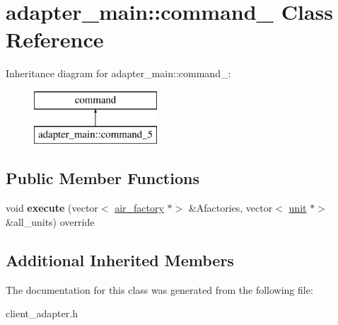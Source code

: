\hypertarget{classadapter__main_1_1command__5}{}\section{adapter\+\_\+main\+:\+:command\+\_ Class Reference}
\label{classadapter__main_1_1command__5}
Inheritance diagram for adapter\+\_\+main\+:\+:command\+\_\+:\begin{figure}[H]
\begin{center}
\leavevmode
\includegraphics[height=2.000000cm]{classadapter__main_1_1command__5}
\end{center}
\end{figure}
\subsection*{Public Member Functions}
\begin{DoxyCompactItemize}
\item 
\mbox{\label{classadapter__main_1_1command__5_a6ec76ad103fdb25233b613bb009c0b46}} 
void {\bfseries execute} (vector$<$ \mbox{\hyperlink{classair__factory}{air\+\_\+factory}} $\ast$$>$ \&Afactories, vector$<$ \mbox{\hyperlink{classunit}{unit}} $\ast$$>$ \&all\+\_\+units) override
\end{DoxyCompactItemize}
\subsection*{Additional Inherited Members}


The documentation for this class was generated from the following file\+:\begin{DoxyCompactItemize}
\item 
client\+\_\+adapter.\+h\end{DoxyCompactItemize}
